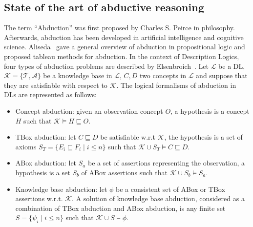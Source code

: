 \documentclass{article}
\begin{document}
\subsection{State of the art of abductive reasoning}
The term ``Abduction'' was first proposed by Charles S. Peirce in philosophy.
Afterwards, abduction has been developed in artificial intelligence and cognitive science.
Aliseda~\cite{aliseda1997seeking} gave a general overview of abduction in propositional logic and proposed tableau methods for abduction.
In the context of Description Logics, four types of abduction problems  are described by Elsenbroich~\cite{elsenbroich2006case}.
Let $\mathcal{L}$ be a DL, $\mathcal{K}=\{\mathcal{T},\mathcal{A}\}$ be a knowledge base in $\mathcal{L}$, $C,D$ two concepts in $\mathcal{L}$ and suppose that they are satisfiable
with respect to  $\mathcal{K}$.
The logical formalisms of abduction in DLs are represented as follows:
\begin{itemize}
 \item Concept abduction: given an observation concept $O$, a hypothesis is a concept $H$ such that $\mathcal{K}\vDash H \sqsubseteq O$.
 \item TBox abduction: let $C\sqsubseteq D$ be satisfiable w.r.t $\mathcal{K}$, the hypothesis is a set of axioms $S_T=\{E_i\sqsubseteq F_i \mid i\leq n\}$
 such that $ \mathcal{K}\cup S_T\vDash C\sqsubseteq D$.
 \item ABox abduction: let $S_a$ be a set of assertions representing the observation, a hypothesis is a set $S_b$ of ABox assertions such that $\mathcal{K} \cup S_b\vDash S_a$.
 \item Knowledge base abduction: let $\phi$ be a consistent set of ABox or TBox assertions w.r.t. $\mathcal{K}$. A solution of knowledge base abduction, considered 
 as a combination of TBox abduction and ABox abduction, is any finite set $S=\{\psi_i \mid i\leq n\}$ such that $ \mathcal{K} \cup S \vDash \phi$.
\end{itemize}
\end{document}
